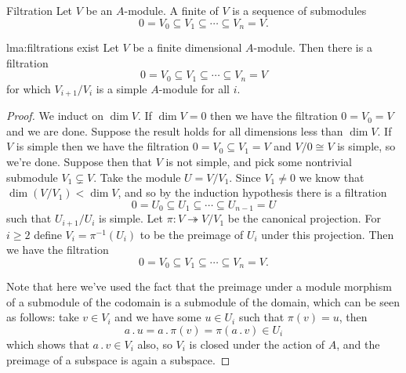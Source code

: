 \documentclass[fleqn]{NotesClass}
\newcommand{\action}{\mathbin{.}}
\newcommand{\isomorphic}{\cong}
\begin{document}
    \begin{dfn}{Filtration}{}
        Let \(V\) be an \(A\)-module.
        A finite  of \(V\) is a sequence of submodules
        \begin{equation}
            0 = V_0 \subseteq V_1 \subseteq \dotsb \subseteq V_n = V.
        \end{equation}
    \end{dfn}
    
    \begin{lma}{}{lma:filtrations exist}
        Let \(V\) be a finite dimensional \(A\)-module.
        Then there is a filtration
        \begin{equation}
            0 = V_0 \subseteq V_1 \subseteq \dotsb \subseteq V_n = V
        \end{equation}
        for which \(V_{i+1}/V_i\) is a simple \(A\)-module for all \(i\).
        \begin{proof}
            We induct on \(\dim V\).
            If \(\dim V = 0\) then we have the filtration \(0 = V_0 = V\) and we are done.
            Suppose the result holds for all dimensions less than \(\dim V\).
            If \(V\) is simple then we have the filtration \(0 = V_0 \subseteq V_1 = V\) and \(V/0 \isomorphic V\) is simple, so we're done.
            Suppose then that \(V\) is not simple, and pick some nontrivial submodule \(V_1 \subsetneq V\).
            Take the module \(U = V/V_1\).
            Since \(V_1 \ne 0\) we know that \(\dim (V / V_1) < \dim V\), and so by the induction hypothesis there is a filtration
            \begin{equation}
                0 = U_0 \subseteq U_1 \subseteq \dotsb \subseteq U_{n-1} = U
            \end{equation}
            such that \(U_{i+1}/U_i\) is simple.
            Let \(\pi \colon V \twoheadrightarrow V/V_1\) be the canonical projection.
            For \(i \ge 2\) define \(V_i = \pi^{-1}(U_i)\) to be the preimage of \(U_i\) under this projection.
            Then we have the filtration
            \begin{equation}
                0 = V_0 \subseteq V_1 \subseteq \dotsb \subseteq V_n = V.
            \end{equation}
            
            Note that here we've used the fact that the preimage under a module morphism of a submodule of the codomain is a submodule of the domain, which can be seen as follows: take \(v \in V_i\) and we have some \(u \in U_i\) such that \(\pi(v) = u\), then
            \begin{equation}
                a \action u = a \action \pi(v) = \pi(a \action v) \in U_i
            \end{equation}
            which shows that \(a \action v \in V_i\) also, so \(V_i\) is closed under the action of \(A\), and the preimage of a subspace is again a subspace.
            

\end{proof}
\end{lma}
\end{document}
